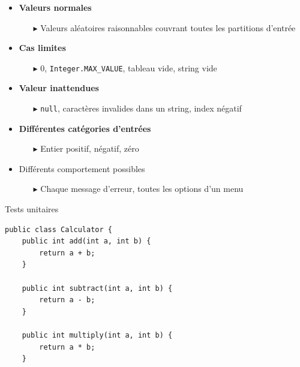 \documentclass[16pt]{report}
\begin{document}
\begin{multicols*}{2}
        \begin{itemize}
            \item \textbf{Valeurs normales}  
                \begin{itemize}
                    \item[$\blacktriangleright$] Valeurs aléatoires raisonnables couvrant toutes les partitions d’entrée
                \end{itemize}
            \item \textbf{Cas limites}  
                \begin{itemize}
                    \item[$\blacktriangleright$] 0, \texttt{Integer.MAX\_VALUE}, tableau vide, string vide
                \end{itemize}
            \item \textbf{Valeur inattendues}  
                \begin{itemize}
                    \item[$\blacktriangleright$] \texttt{null}, caractères invalides dans un string, index négatif
                \end{itemize}
            \item \textbf{Différentes catégories d'entrées}  
                \begin{itemize}
                    \item[$\blacktriangleright$] Entier positif, négatif, zéro
                \end{itemize}
            \item Différents comportement possibles
                \begin{itemize}
                    \item[$\blacktriangleright$] Chaque message d’erreur, toutes les options d’un menu
                \end{itemize}

        \end{itemize}


        \begin{EExample}{Tests unitaires}{}


\begin{lstlisting}[style=JavaDraculaWhite]
 public class Calculator {
    public int add(int a, int b) {
        return a + b;
    }

    public int subtract(int a, int b) {
        return a - b;
    }

    public int multiply(int a, int b) {
        return a * b;
    }


\end{lstlisting}
\end{EExample}
\end{multicols*}
\end{document}
